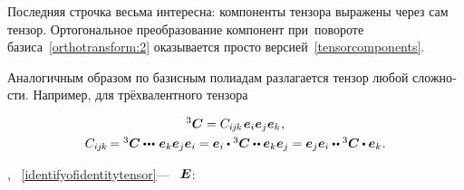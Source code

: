 \begin{otherlanguage}{russian}

\vspace{-0.2em}\noindent
Последняя строчка весьма интересна: компоненты тензора выражены через сам тензор.
Ортогональное преобразование компонент при~повороте базиса~\eqref{orthotransform:2} оказывается просто версией~\eqref{tensorcomponents}.

Аналогичным образом по базисным полиадам разлагается тензор любой сложности.
Например, для трёхвалентного тензора

\nopagebreak\begin{equation}\label{polyada:3}
\begin{array}{c}
{^3\!\,\bm{C}} = C_{i\hspace{-0.1ex}j\hspace{-0.1ex}k} \hspace{.2ex} \bm{e}_i \bm{e}_j \bm{e}_k \hspace{.1ex},
\\[.8ex]
C_{i\hspace{-0.1ex}j\hspace{-0.1ex}k} \hspace{-0.2ex} = {^3\!\,\bm{C}} \dotdotdotp \bm{e}_k \bm{e}_j \bm{e}_i = \bm{e}_i \dotp {^3\!\,\bm{C}} \dotdotp \bm{e}_k \bm{e}_j = \bm{e}_j \bm{e}_i \dotdotp {^3\!\,\bm{C}} \dotp \bm{e}_k \hspace{.1ex}.
\end{array}
\end{equation}

\end{otherlanguage}

 ,   ~\eqref{identifyofidentitytensor}\:---  ~$\bm{E}$:

